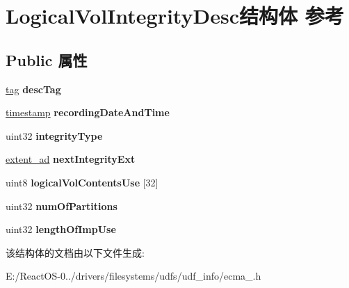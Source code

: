 \hypertarget{struct_logical_vol_integrity_desc}{}\section{Logical\+Vol\+Integrity\+Desc结构体 参考}
\label{struct_logical_vol_integrity_desc}
\subsection*{Public 属性}
\begin{DoxyCompactItemize}
\item 
\mbox{\label{struct_logical_vol_integrity_desc_a709af571e25cc519a5e584cda17bd6f3}} 
\hyperlink{structtag}{tag} {\bfseries desc\+Tag}
\item 
\mbox{\label{struct_logical_vol_integrity_desc_a509841fc26fce8e545e98b3166287707}} 
\hyperlink{structtimestamp}{timestamp} {\bfseries recording\+Date\+And\+Time}
\item 
\mbox{\label{struct_logical_vol_integrity_desc_afa380dfab1fee5d5d08d463042c3f002}} 
uint32 {\bfseries integrity\+Type}
\item 
\mbox{\label{struct_logical_vol_integrity_desc_aaac29776bb8811154baf22a1cbe3f1fa}} 
\hyperlink{struct___e_x_t_e_n_t___a_d}{extent\+\_\+ad} {\bfseries next\+Integrity\+Ext}
\item 
\mbox{\label{struct_logical_vol_integrity_desc_a82606a2e4fe7c1bdf60a1030ffe11daf}} 
uint8 {\bfseries logical\+Vol\+Contents\+Use} \mbox{[}32\mbox{]}
\item 
\mbox{\label{struct_logical_vol_integrity_desc_af9cd67723a771702fc6b99ad290bf7f6}} 
uint32 {\bfseries num\+Of\+Partitions}
\item 
\mbox{\label{struct_logical_vol_integrity_desc_a17d77b6dff19d0d149d5c30e125e10c6}} 
uint32 {\bfseries length\+Of\+Imp\+Use}
\end{DoxyCompactItemize}


该结构体的文档由以下文件生成\+:\begin{DoxyCompactItemize}
\item 
E\+:/\+React\+O\+S-\/0../drivers/filesystems/udfs/udf\+\_\+info/ecma\+\_.\+h\end{DoxyCompactItemize}

